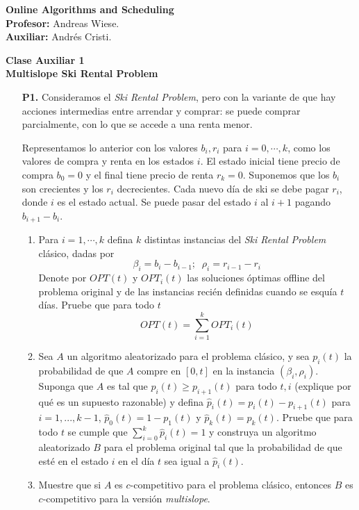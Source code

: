 \documentclass[11pt, spanish]{article}
\theoremstyle{plain}
\begin{document}

\begin{flushleft}
  \textbf{Online Algorithms and Scheduling}
  \\\textbf{Profesor:} Andreas Wiese.
  \\\textbf{Auxiliar:} Andrés Cristi.
\end{flushleft}


\begin{center}
  \large{\textbf{Clase Auxiliar 1\\ Multislope Ski Rental Problem}}
\end{center}




\begin{itemize}
\item[\textbf{P1.}] Consideramos el \emph{Ski Rental Problem}, pero
con la variante de que hay acciones intermedias entre arrendar y comprar:
se puede comprar parcialmente, con lo que se accede a una renta menor.

Representamos lo anterior con los valores $b_i,r_i$ para $i=0,\cdots, k$,
como los valores de compra y renta en los estados $i$. El estado inicial
tiene precio de compra $b_0=0$ y el final tiene precio de renta $r_k=0$.
Suponemos que los $b_i$ son crecientes y los $r_i$ decrecientes. Cada nuevo día de ski se debe pagar $r_i$, donde $i$ es el estado actual. Se
puede pasar del estado $i$ al $i+1$ pagando $b_{i+1}-b_i$.

\begin{enumerate}
    \item Para $i=1,\cdots,k$ defina $k$ distintas instancias del
    \emph{Ski Rental Problem} clásico, dadas por
    \[
     \beta_i= b_i - b_{i-1}; \; \; \rho_i = r_{i-1} - r_i
    \]
    Denote por $OPT(t)$ y $OPT_i(t)$ las soluciones óptimas offline
    del problema original y de las instancias recién definidas cuando
    se esquía $t$ días. Pruebe que para todo $t$
    \[
      OPT(t) = \sum_{i=1}^k OPT_i(t)
    \]
    
    \item Sea $A$ un algoritmo aleatorizado para el problema clásico,
    y sea $p_i(t)$ la probabilidad de que $A$ compre en $[0,t]$ en la
    instancia $(\beta_i, \rho_i)$. Suponga que $A$ es tal que $p_i(t)\geq p_{i+1}(t)$ para todo $t,i$ (explique por qué es un supuesto
    razonable) y defina $\hat{p}_i(t)= p_i(t)-p_{i+1}(t)$
    para $i=1,...,k-1$,
    $\hat{p}_0(t)=1-p_1(t)$ y $\hat{p}_k(t)= p_k(t)$. Pruebe que
    para todo $t$ se cumple que
    $\sum_{i=0}^k \hat{p}_i(t) =1$ y construya un algoritmo aleatorizado
    $B$ para el problema original tal que la probabilidad de que
    esté en el estado $i$ en el día $t$ sea igual a $\hat{p}_i(t)$.
    
    \item Muestre que si $A$ es $c$-competitivo para el problema
    clásico, entonces $B$ es $c$-competitivo para la versión
    \emph{multislope}.
\end{enumerate}
\end{itemize}
\end{document}
